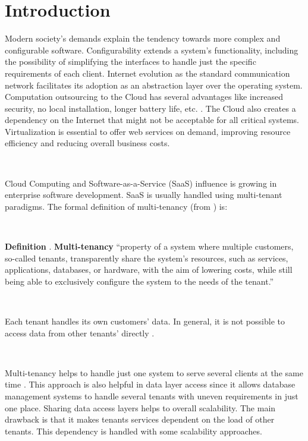 \documentclass[12pt,english]{article} %
\newcounter{definitioncounter}
\newcommand*{\definition}[2]{\textbf{Definition \thedefinitioncounter\refstepcounter{definitioncounter}}.
\textbf{#1}#2}
\begin{document}
\newpage
\shipout\null %
\newpage




\maketitle
\tableofcontents %
\setlength\parindent{0pt} %


\newpage
\shipout\null %
\newpage

\section{Introduction}

Modern society's demands explain the tendency towards more complex and configurable software.
Configurability extends a system's functionality, including the possibility of simplifying the interfaces to handle just the specific requirements of each client.
Internet evolution as the standard communication network facilitates its adoption as an abstraction layer over the operating system.
Computation outsourcing to the Cloud has several advantages like increased security, no local installation, longer battery life, etc. \cite{humanes2016}.
The Cloud also creates a dependency on the Internet that might not be acceptable for all critical systems.
Virtualization is essential to offer web services on demand, improving resource efficiency and reducing overall business costs.

\

Cloud Computing and Software-as-a-Service (SaaS) influence is growing in enterprise software development.
SaaS is usually handled using multi-tenant paradigms. The formal definition of multi-tenancy (from \cite{defining-multi-tenancy}) is:

\

\definition{Multi-tenancy}{ ``property of a system where multiple customers, so-called tenants, transparently share the system’s resources, such as services, applications, databases, or hardware, with the aim of lowering costs, while still being able to exclusively conﬁgure the system to the needs of the tenant.'' \cite{defining-multi-tenancy}}

\

Each tenant handles its own customers' data.
In general, it is not possible to access data from other tenants' directly \cite{defining-multi-tenancy}.

\

Multi-tenancy helps to handle just one system to serve several clients at the same time \cite{shiller2011}.
This approach is also helpful in data layer access since it allows database management systems to handle several tenants with uneven requirements in just one place.
Sharing  data access layers helps to overall scalability.
The main drawback is that it makes tenants services dependent on the load of other tenants.
This dependency is handled with some scalability approaches.
\end{document}
